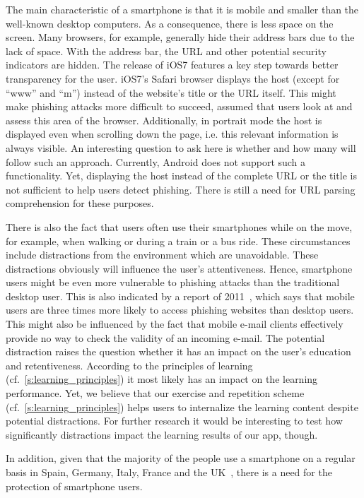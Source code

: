 \begin{description}[leftmargin=0cm]
	\item[Mobility and Size:] The main characteristic of a smartphone is that it is mobile and smaller than the well-known desktop computers.
 As a consequence, there is less space on the screen.
 Many browsers, for example, generally hide their address bars due to the lack of space.
 With the address bar, the URL and other potential security indicators are hidden.
The release of iOS7 features a key step towards better transparency for the user.
iOS7's Safari browser displays the host (except for ``www'' and ``m'') instead of the website's title or the URL itself.
This might make phishing attacks more difficult to succeed, assumed that users look at and assess this area of the browser.
Additionally, in portrait mode the host is displayed even when scrolling down the page, i.e. this relevant information is always visible.
An interesting question to ask here is whether and how many will follow such an approach.
Currently, Android does not support such a functionality. 
Yet, displaying the host instead of the complete URL or the title is not sufficient to help users detect phishing.
There is still a need for URL parsing comprehension for these purposes.
	\item[Distraction Caused by Mobility:] There is also the fact that users often use their smartphones while on the move, for example, when walking or  during a train or a bus ride.
 These circumstances include distractions from the environment which are unavoidable.
 These distractions obviously will influence the user's attentiveness.
 Hence, smartphone users might be even more vulnerable to phishing attacks than the traditional desktop user.
 This is also indicated by a report of 2011~\cite{trusteer2011}, which says that mobile users are three times more likely to access phishing websites than desktop users.
 This might also be influenced by the fact that mobile e-mail clients effectively provide no way to check the validity of an incoming e-mail.
The potential distraction raises the question whether it has an impact on the user's education and retentiveness.
According to the principles of learning (cf.~\autoref{s:learning_principles}) it most likely has an impact on the learning performance.
Yet, we believe that our exercise and repetition scheme (cf.~\autoref{s:learning_principles}) helps users to internalize the learning content despite potential distractions.
For further research it would be interesting to test how significantly distractions impact the learning results of our app, though.
	\item[High Number of Smartphone Users:] In addition, given that the majority of the people use a smartphone on a regular basis in Spain, Germany, Italy, France and the UK~\cite{smartphoneusage}, there is a need for the protection of smartphone users.
\end{description} 

